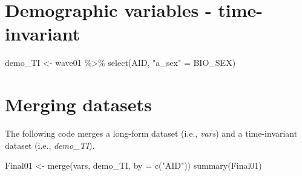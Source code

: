 \documentclass[
]{book}
\newenvironment{Shaded}{\begin{snugshade}}{\end{snugshade}}
\newcommand{\AttributeTok}[1]{\textcolor[rgb]{0.77,0.63,0.00}{#1}}
\newcommand{\CommentTok}[1]{\textcolor[rgb]{0.56,0.35,0.01}{\textit{#1}}}
\newcommand{\ConstantTok}[1]{\textcolor[rgb]{0.00,0.00,0.00}{#1}}
\newcommand{\FunctionTok}[1]{\textcolor[rgb]{0.00,0.00,0.00}{#1}}
\newcommand{\NormalTok}[1]{#1}
\newcommand{\OtherTok}[1]{\textcolor[rgb]{0.56,0.35,0.01}{#1}}
\newcommand{\SpecialCharTok}[1]{\textcolor[rgb]{0.00,0.00,0.00}{#1}}
\newcommand{\StringTok}[1]{\textcolor[rgb]{0.31,0.60,0.02}{#1}}
\begin{document}
\begin{Shaded}
\end{Shaded}

\hypertarget{demographic-variables---time-invariant}{%
\section{Demographic variables - time-invariant}\label{demographic-variables---time-invariant}}

\begin{Shaded}
\begin{Highlighting}[]
\NormalTok{demo\_TI }\OtherTok{\textless{}{-}}\NormalTok{ wave01 }\SpecialCharTok{\%\textgreater{}\%}
  \FunctionTok{select}\NormalTok{(AID,}
         \StringTok{"a\_sex"} \OtherTok{=}\NormalTok{ BIO\_SEX)}
\end{Highlighting}
\end{Shaded}

\hypertarget{merging-datasets}{%
\section{Merging datasets}\label{merging-datasets}}

The following code merges a long-form dataset (i.e., \emph{vars}) and a time-invariant dataset (i.e., \emph{demo\_TI}).

\begin{Shaded}
\begin{Highlighting}[]
\NormalTok{Final01 }\OtherTok{\textless{}{-}} \FunctionTok{merge}\NormalTok{(vars, demo\_TI, }\AttributeTok{by =} \FunctionTok{c}\NormalTok{(}\StringTok{"AID"}\NormalTok{))}
\FunctionTok{summary}\NormalTok{(Final01)}
\end{Highlighting}
\end{Shaded}
\end{document}
